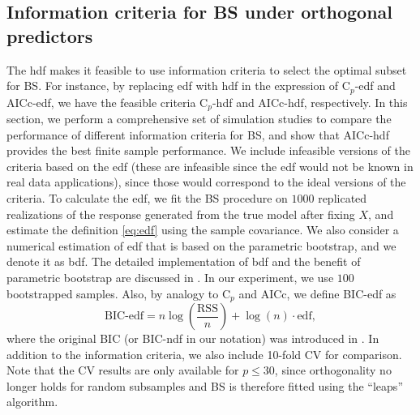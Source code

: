 \subsection{Information criteria for BS under orthogonal predictors}
\label{sec:aicc_performance_bs}

The hdf makes it feasible to use information criteria to select the optimal subset for BS. For instance, by replacing edf with hdf in the expression of C$_p$-edf and AICc-edf, we have the feasible criteria C$_p$-hdf and AICc-hdf, respectively. In this section, we perform a comprehensive set of simulation studies to compare the performance of different information criteria for BS, and show that AICc-hdf provides the best finite sample performance. We include infeasible versions of the criteria based on the edf (these are infeasible since the edf would not be known in real data applications), since those would correspond to the ideal versions of the criteria. To calculate the edf, we fit the BS procedure on $1000$ replicated realizations of the response generated from the true model after fixing $X$, and estimate the definition \eqref{eq:edf} using the sample covariance. We also consider a numerical estimation of edf that is based on the parametric bootstrap, and we denote it as bdf. The detailed implementation of bdf and the benefit of parametric bootstrap are discussed in \citet{Efron2004}. In our experiment, we use $100$ bootstrapped samples. Also, by analogy to C$_p$ and AICc, we define BIC-edf as
\begin{equation*}
\text{BIC-edf} = n \log\left(\frac{\text{RSS}}{n}\right) + \log(n) \cdot \text{edf},
\end{equation*}
where the original BIC (or BIC-ndf in our notation) was introduced in \citet{schwarz1978estimating}. In addition to the information criteria, we also include 10-fold CV for comparison. Note that the CV results are only available for $p \le 30$, since orthogonality no longer holds for random subsamples and BS is therefore fitted using the ``leaps'' algorithm.


